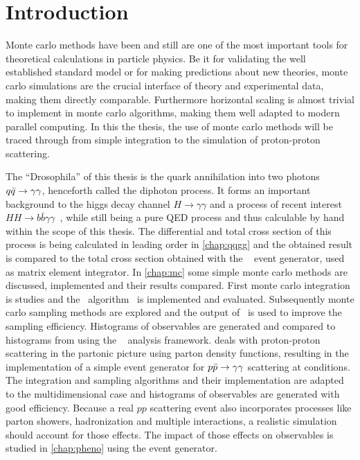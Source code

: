 \chapter{Introduction}%
\label{chap:intro}

Monte carlo methods have been and still are one of the most important
tools for theoretical calculations in particle physics. Be it for
validating the well established standard model or for making
predictions about new theories, monte carlo simulations are the
crucial interface of theory and experimental data, making them
directly comparable. Furthermore horizontal scaling is almost trivial
to implement in monte carlo algorithms, making them well adapted to
modern parallel computing. In this the thesis, the use of monte carlo
methods will be traced through from simple integration to the
simulation of proton-proton scattering.

The ``Drosophila'' of this thesis is the quark annihilation into two
photons \(q\bar{q}\rightarrow\gamma\gamma\), henceforth called the diphoton process. It forms an
important background to the higgs decay channel
\(H\rightarrow \gamma\gamma\) and a process of recent interest
\(HH\rightarrow b\bar{b}\gamma\gamma\)~\cite{aaboud2018:sf}, while
still being a pure QED process and thus calculable by hand within the
scope of this thesis. The differential and total cross section of this
process is being calculated in leading order in \cref{chap:qqgg} and
the obtained result is compared to the total cross section obtained
with the \sherpa~\cite{Gleisberg:2008ta} event generator, used as
matrix element integrator. In \cref{chap:mc} some simple monte carlo
methods are discussed, implemented and their results compared. First
monte carlo integration is studies and the \vegas\
algorithm~\cite{Lepage:19781an} is implemented and
evaluated. Subsequently monte carlo sampling methods are explored and
the output of \vegas\ is used to improve the sampling
efficiency. Histograms of observables are generated and compared to
histograms from \sherpa using the \rivet~\cite{Bierlich:2019rhm}
analysis framework. \Cref{chap:pdf} deals with proton-proton
scattering in the partonic picture using parton density functions,
resulting in the implementation of a simple event generator for
\(p\bar{p}\rightarrow\gamma\gamma\) scattering at \lhc conditions. The integration and sampling
algorithms and their implementation are adapted to the
multidimensional case and histograms of observables are generated with
good efficiency.  Because a real \(pp\) scattering event also
incorporates processes like parton showers, hadronization and multiple
interactions, a realistic simulation should account for those
effects. The impact of those effects on observables is studied in
\cref{chap:pheno} using the \sherpa event generator.

